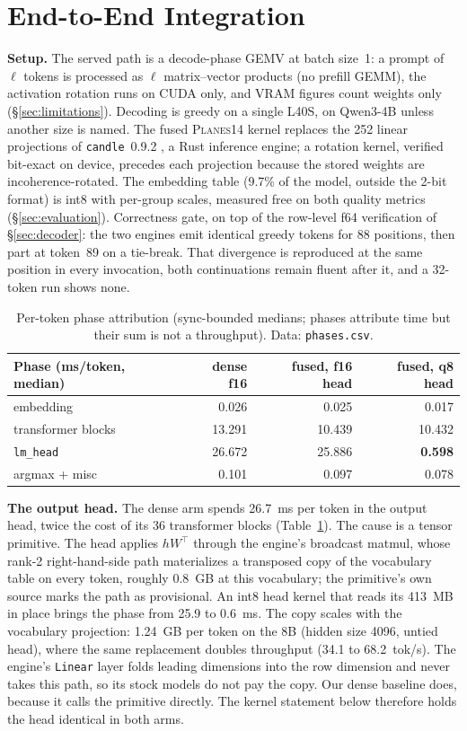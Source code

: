 \section{End-to-End Integration}
\label{sec:integration}

\textbf{Setup.} The served path is a decode-phase GEMV at batch size~1: a
prompt of $\ell$ tokens is processed as $\ell$ matrix--vector products (no
prefill GEMM), the activation rotation runs on CUDA only, and VRAM figures
count weights only (\S\ref{sec:limitations}). Decoding is greedy on a single
L40S, on Qwen3-4B unless another size is named. The fused \textsc{Planes14}
kernel replaces the 252 linear projections of \texttt{candle}~0.9.2
\citep{candle2023}, a Rust inference engine; a rotation kernel, verified
bit-exact on device, precedes each projection because the stored weights are
incoherence-rotated. The embedding table (9.7\% of the model, outside the
2-bit format) is int8 with per-group scales, measured free on both quality
metrics (\S\ref{sec:evaluation}). Correctness gate, on top of the row-level f64 verification of
\S\ref{sec:decoder}: the two engines emit identical greedy tokens for 88
positions, then part at token~89 on a tie-break. That divergence is
reproduced at the same position in every invocation, both continuations
remain fluent after it, and a 32-token run shows none.

\begin{table}[t]
\centering
\small
\begin{tabular}{lrrr}
\toprule
Phase (ms/token, median) & dense f16 & fused, f16 head & fused, q8 head \\
\midrule
embedding & 0.026 & 0.025 & 0.017 \\
transformer blocks & 13.291 & 10.439 & 10.432 \\
\texttt{lm\_head} & 26.672 & 25.886 & \textbf{0.598} \\
argmax + misc & 0.101 & 0.097 & 0.078 \\
\bottomrule
\end{tabular}
\caption{Per-token phase attribution (sync-bounded medians; phases
attribute time but their sum is not a throughput). Data:
\texttt{phases.csv}.}
\label{tab:phases}
\end{table}

\textbf{The output head.} The dense arm spends 26.7~ms per token in the
output head, twice the cost of its 36 transformer blocks
(Table~\ref{tab:phases}). The cause is a tensor primitive. The head applies
$hW^{\top}$ through the engine's broadcast matmul, whose rank-2
right-hand-side path materializes a transposed copy of the vocabulary table
on every token, roughly 0.8~GB at this vocabulary; the primitive's own
source marks the path as provisional. An int8 head kernel that reads its
413~MB in place brings the phase from 25.9 to 0.6~ms. The copy scales with
the vocabulary projection: 1.24~GB per token on the 8B (hidden size 4096,
untied head), where the same replacement doubles throughput (34.1 to
68.2~tok/s). The engine's \texttt{Linear} layer folds leading dimensions
into the row dimension and never takes this path, so its stock models do
not pay the copy. Our dense baseline does, because it calls the primitive
directly. The kernel statement below therefore holds the head identical in
both arms.

